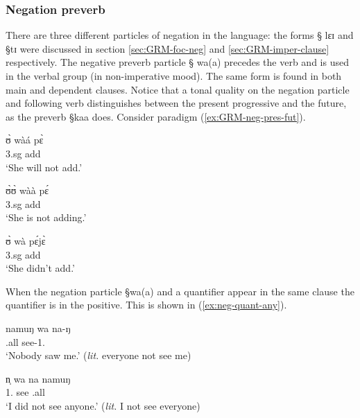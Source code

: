 \subsubsection{Negation preverb}
\label{sec:GRM-verb-neg}



There are three different particles of negation in the language:  the forms {\S
lɛɪ} and {\S tɪ}   were discussed in section   \ref{sec:GRM-foc-neg} and
\ref{sec:GRM-imper-clause} respectively.  The negative preverb particle {\S
wa(a)} precedes the verb and is used in the verbal group (in non-imperative
mood). The same form is found in both  main and dependent clauses. Notice that a
tonal quality on the negation particle and following verb  distinguishes
between the present
progressive and  the future,  as the preverb {\S kaa} does.  Consider 
paradigm (\ref{ex:GRM-neg-pres-fut}). 

\begin{exe}
\ex\label{ex:GRM-neg-pres-fut}
\begin{xlist}
\ex
\gll ʊ̀  wàá pɛ̀ \\
   {\sc 3.sg}  {\neg} add\\
\glt  `She will not add.'

 \ex 
\gll  ʊ̀ʊ̀ wàà pɛ́\\
     {\sc 3.sg} {\neg} add \\
\glt  `She is not adding.'


 \ex 
\gll  ʊ̀ wà pɛ́jɛ̀\\
     {\sc 3.sg} {\neg} add \\
\glt  `She didn't  add.'
\end{xlist}
\end{exe}


When the negation particle {\S wa(a)} and a quantifier appear in the same clause
the quantifier is  in the positive. This is shown in (\ref{ex:neg-quant-any}).

\begin{exe}
\ex\label{ex:neg-quant-any}
 \begin{xlist}
  
\ex\label{ex:neg-quant-any-1}
\gll namuŋ wa na-ŋ \\
 {\clf}.all {\neg} see-{1.\sg}\\
\glt  `Nobody saw me.' ({\it lit.} everyone not see me) 

\ex\label{ex:neg-quant-any-2}
\gll  n̩ wa na namuŋ  \\
  {1.\sg}  {\neg}   see  {\clf}.all\\
\glt  `I did not see anyone.' ({\it lit.} I not see everyone) 
\end{xlist}
\end{exe}


